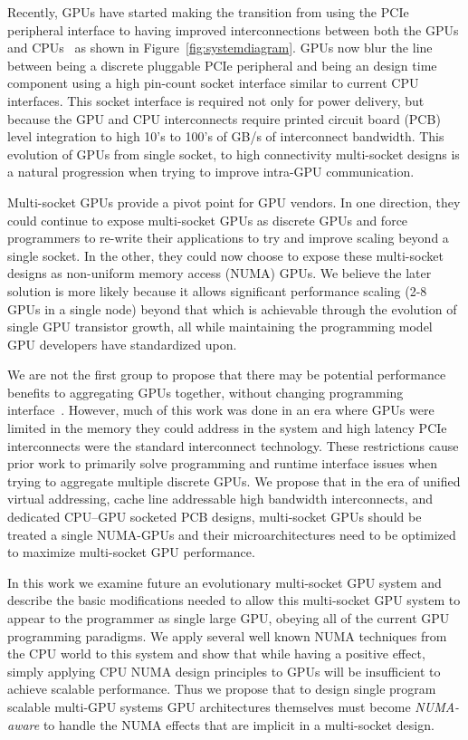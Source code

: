 Recently, GPUs have started making the transition from using the PCIe peripheral 
interface
to having improved interconnections between both the GPUs and 
CPUs~\cite{dgx,AMDINFINITYFABRIC}
as shown in Figure~\ref{fig:systemdiagram}.  GPUs now blur the line between 
being
a discrete pluggable PCIe peripheral and being an design time component using a 
high pin-count
socket interface similar to current CPU interfaces.  This socket interface is required
not only for power delivery, but because the GPU and CPU interconnects require printed
circuit board (PCB) level integration to high 10's to 100's of GB/s of interconnect bandwidth.
This evolution of GPUs from single socket, to high connectivity multi-socket designs
is a natural progression when trying to improve intra-GPU communication.

Multi-socket GPUs provide a pivot point for GPU vendors.  In one direction, they
could continue to expose multi-socket GPUs as discrete GPUs and force programmers
to re-write their applications to try and improve scaling beyond a single socket.
In the other, they could now choose to expose these multi-socket designs as
non-uniform memory access (NUMA) GPUs.  We believe the later solution is more likely
because it allows significant performance scaling (2-8 GPUs in a single node) beyond
that which is achievable through the evolution of single GPU transistor growth, all
while maintaining the programming model GPU developers have standardized upon.

We are not the first group to propose that there may be potential performance
benefits to aggregating GPUs together, without changing programming 
interface~\cite{Cabezas2015,lee2013transparent,XXX,XXX}. However, much of this work
was done in an era where GPUs were limited in the memory they could address
in the system and high latency PCIe interconnects were the standard interconnect
technology.  These restrictions cause prior work to primarily solve programming and runtime
interface issues when trying to aggregate multiple discrete GPUs.  We propose
that in the era of unified virtual addressing, cache line addressable high bandwidth
interconnects, and dedicated CPU--GPU socketed PCB designs, multi-socket GPUs
should be treated a single NUMA-GPUs and their microarchitectures need to be optimized
to maximize multi-socket GPU performance.

In this work we examine future an evolutionary multi-socket GPU system and describe the 
basic modifications needed to allow this multi-socket GPU system to appear to the programmer
as single large GPU, obeying all of the current GPU programming paradigms. We apply 
several well known NUMA techniques from the CPU world to this system and show that
while having a positive effect, simply applying CPU NUMA design principles to GPUs 
will be insufficient to achieve scalable performance.  Thus we propose that to design
single program scalable multi-GPU systems GPU architectures themselves must become
\textit{NUMA-aware} to handle the NUMA effects that are implicit in a multi-socket
design.

